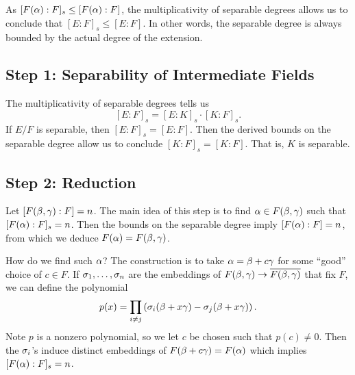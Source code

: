 As $[F(\alpha):F]_s \leq [F(\alpha):F]$, the multiplicativity of separable degrees allows us to conclude that $[E:F]_s \leq [E:F]$. In other words, the separable degree is always bounded by the actual degree of the extension.

\subsection{Step 1: Separability of Intermediate Fields}
The multiplicativity of separable degrees tells us
\[
    [E:F]_s = [E:K]_s \cdot [K:F]_s.
\]
If $E/F$ is separable, then $[E:F]_s = [E:F]$. Then the derived bounds on the separable degree allow us to conclude $[K:F]_s = [K:F]$. That is, $K$ is separable.

\subsection{Step 2: Reduction}
Let $[F(\beta,\gamma):F] = n$. The main idea of this step is to find $\alpha \in F(\beta,\gamma)$ such that $[F(\alpha):F]_s = n$. Then the bounds on the separable degree imply $[F(\alpha):F] = n$, from which we deduce $F(\alpha) = F(\beta,\gamma)$.

How do we find such $\alpha$? The construction is to take $\alpha = \beta + c\gamma$ for some ``good'' choice of $c \in F$. If $\sigma_1, \dots, \sigma_n$ are the embeddings of $F(\beta,\gamma) \to \overline{F(\beta,\gamma)}$ that fix $F$, we can define the polynomial
\[
    p(x) = \prod_{i \neq j} \left( \sigma_i(\beta + x\gamma) - \sigma_j(\beta + x\gamma) \right).
\]
Note $p$ is a nonzero polynomial, so we let $c$ be chosen such that $p(c) \neq 0$. Then the $\sigma_i$'s induce distinct embeddings of $F(\beta + c\gamma) = F(\alpha)$ which implies $[F(\alpha):F]_s = n$.